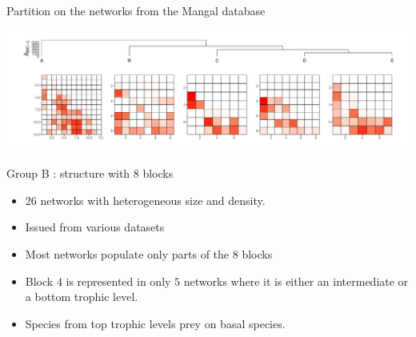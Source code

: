 \documentclass[compress,10pt]{beamer}
\begin{document}
\begin{frame}{Partition on the networks from the Mangal database}

    \includegraphics[width=\hsize]{plots/rmangal_pi_newpen_dend_meso}
     

\alert{Group B} : structure with 8 blocks 
\begin{itemize}
 \item $26$ networks with heterogeneous size and density. 
 \item Issued from various datasets
 \item Most networks populate only parts of the $8$ blocks
 \item Block $4$ is represented in only $5$ networks where it is either an intermediate or a bottom trophic level.  
 \item Species from top trophic levels prey on basal species.  
\end{itemize}

\end{frame}
\end{document}
